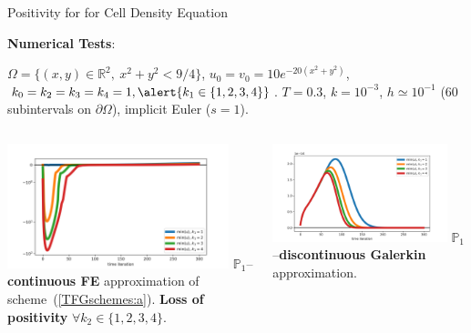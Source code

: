 \documentclass[final]{beamer}
\newlength{\onecolwid}
\begin{document}
\begin{frame}[t]
\begin{columns}[t]
\begin{column}{\onecolwid}
\begin{block}{Positivity for for Cell Density Equation}
        \bigskip\par
        \textbf{Numerical Tests}:
        \begin{small}
          $\Omega=\{(x,y)\in \mathbb{R}^2,\ x^2+y^2< 9/4\}$,
          $u_0=v_0=10 e^{-20( x^2 + y^2 ) }$,
          $k_0=k_2=k_3=k_4=1, \alert{k_1\in\{1,2,3,4\}}$. $T=0.3$, $k=10^{-3}$,
          $h\simeq 10^{-1}$ ($60$ subintervals on $\partial\Omega$),
          implicit Euler ($s=1$).
          \begin{columns}
            \includegraphics[width=0.9\textwidth]{negative_min_u_k1=1,2,3,4.png}
            \alert{$\mathbb{P}_1$--\textbf{continuous FE}} approximation of
            scheme~(\ref{TFGschemes:a}). \textbf{Loss of positivity}
            $\forall k_2\in\{1,2,3,4\}$.

            \includegraphics[width=0.9\textwidth]{positive_min_u_k1=1,2,3,4.png}
            \alert{$\mathbb{P}_1$--\textbf{discontinuous Galerkin}}
            approximation. 
          \end{columns}
        \end{small}
      \end{block}



\end{column}
\end{columns}
\end{frame}
\end{document}
